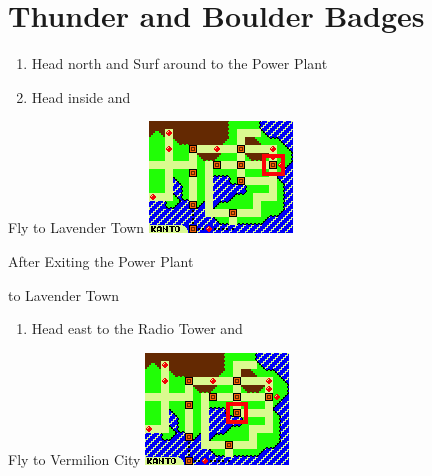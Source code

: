 \chapter{Thunder and Boulder Badges}
\vspace{0.5mm}

\begin{paracol}{2}
\begin{enumerate}
	\item Head north and Surf around to the Power Plant
	\item Head inside and 
\end{enumerate}

\switchcolumn
\begin{story}{Fly to Lavender Town}
	\varwb
	\includegraphics[scale=1.0125]{../Graphics/27. Lavender Town.png}
	\varwe
\end{story}

\switchcolumn
\begin{menu}{After Exiting the Power Plant}
	\varwb
	\begin{pokeMenu} 
		\item {} \fly{} to Lavender Town \menuHlTwo{(3\pointDown)}
	\end{pokeMenu}
	\varwe
\end{menu}

\begin{enumerate}[resume]
	\item Head east to the Radio Tower and 
\end{enumerate}

\switchcolumn
\begin{story}{Fly to Vermilion City}
	\varwb
	\includegraphics[scale=1.0125]{../Graphics/18. Vermilion City.png}
	\varwe
\end{story}


\end{paracol}
